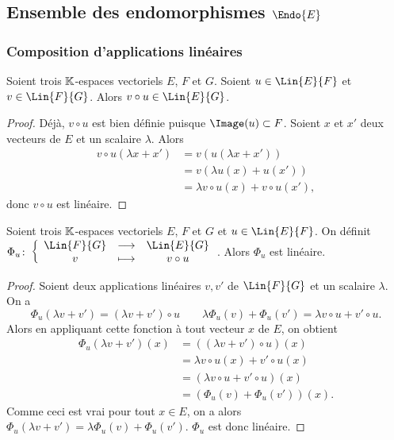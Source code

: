 \subsection{Ensemble des endomorphismes $\Endo{E}$}
\subsubsection{Composition d'applications linéaires}
\begin{theo}
  Soient trois $\mathbb{K}$-espaces vectoriels $E$, $F$ et $G$. Soient $u \in \Lin{E}{F}$ et $v\in \Lin{F}{G}$. Alors $v\circ u \in \Lin{E}{G}$.
\end{theo}
\begin{proof}
  Déjà, $v\circ u$ est bien définie puisque $\Image(u) \subset F$. Soient $x$ et $x'$ deux vecteurs de $E$ et un scalaire $\lambda$. Alors
  \begin{align}
    v\circ u(\lambda x+x') &=v(u(\lambda x+x')) \\
    &=v(\lambda u(x)+u(x'))\\
    &=\lambda v\circ u(x) + v\circ u(x'),
  \end{align}
  donc $v\circ u$ est linéaire.
\end{proof}

\begin{prop}
  Soient trois $\mathbb{K}$-espaces vectoriels $E$, $F$ et $G$ et $u \in \Lin{E}{F}$. On définit $\fonction{\Phi_u}{\Lin{F}{G}}{\Lin{E}{G}}{v}{v \circ u}$. Alors $\Phi_u$ est linéaire.
\end{prop}
\begin{proof}
  Soient deux applications linéaires $v,v'$ de $\Lin{F}{G}$ et un scalaire $\lambda$. On a
  \begin{equation}
    \Phi_u(\lambda v+v')=(\lambda v+v') \circ u \qquad \lambda \Phi_u(v)+\Phi_u(v')=\lambda v \circ u + v' \circ u.
  \end{equation}
  Alors en appliquant cette fonction à tout vecteur $x$ de $E$, on obtient
  \begin{align}
    \Phi_u(\lambda v+v')(x) &= ((\lambda v+v') \circ u)(x) \\
    &= \lambda v \circ u(x) + v' \circ u (x) \\
    &=(\lambda v \circ u + v'\circ u)(x) \\
    &=(\Phi_u(v)+\Phi_u(v'))(x).
  \end{align}
  Comme ceci est vrai pour tout $x \in E$, on a alors $\Phi_u(\lambda v+v') = \lambda \Phi_u(v)+\Phi_u(v')$. $\Phi_u$ est donc linéaire.
\end{proof}

